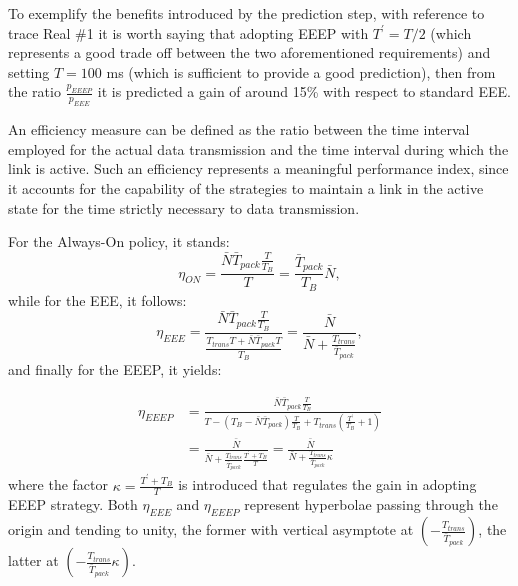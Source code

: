 \documentclass[journal,10pt,twoside,final]{IEEEtran}
\begin{document}
To exemplify the benefits introduced by the prediction step, with reference to trace Real \#1 it is worth saying that adopting EEEP with $T^\prime=T/2$ (which represents a good trade off between the two aforementioned requirements) and setting $T=100$ ms (which is sufficient to provide a good prediction), then from the ratio $\frac{p_{EEEP}}{{p_{EEE}}}$ it is predicted a gain of around 15\% with respect to standard EEE.
 
An efficiency measure can be defined as the ratio between the time interval employed for the actual data transmission and the time interval during which the link is active. Such an efficiency represents a meaningful performance index, since it accounts for the capability of the strategies to maintain a link in the active state for the time strictly necessary to data transmission.

For the Always-On policy, it stands:
\begin{equation}
\eta_{ON}=\frac{\bar{N}\bar{T}_{pack}\frac{T}{T_B}}{T}=\frac{\bar{T}_{pack}}{T_B}\bar{N},
\label{eq:etaON}
\end{equation}
while for the EEE, it follows: \begin{equation}
\eta_{EEE}=\frac{\bar{N}\bar{T}_{pack}\frac{T}{T_B}}{\frac{T_{trans}T+\bar{N}\bar{T}_{pack}T}{T_B}}=
\frac{\bar{N}}{\bar{N}+\frac{T_{trans}}{\bar{T}_{pack}}},\label{eq:etaEEE}
\end{equation}
and finally for the EEEP, it yields:

\begin{align}
\eta_{EEEP}&=\frac{\bar{N}\bar{T}_{pack}\frac{T}{T_B}}{T-\left(T_B-\bar{N}\bar{T}_{pack}\right)\frac{T}{T_B}+ T_{trans}\left(\frac{T^\prime}{T_B}+1\right)}\\                 
&=\frac{\bar{N}}{\bar{N}+\frac{T_{trans}}{\bar{T}_{pack}} \frac{T^\prime+T_B}{T}}
                     =\frac{\bar{N}}{\bar{N}+\frac{T_{trans}}{\bar{T}_{pack}} \kappa}
\label{eq:etaEEEP}
\end{align}
where the factor $\kappa=\frac{T^\prime+T_B}{T}$ is introduced that regulates the gain in adopting EEEP strategy. 
Both $\eta_{EEE}$ and $\eta_{EEEP}$ represent hyperbolae passing through the origin and tending to unity, the former with vertical asymptote at $\left(-\frac{T_{trans}}{\bar{T}_{pack}}\right)$, the latter at $\left(-\frac{T_{trans}}{\bar{T}_{pack}}\kappa\right)$. 
\end{document}
